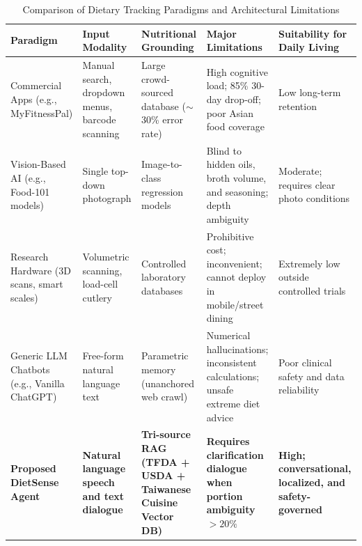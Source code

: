 \documentclass[conference]{IEEEtran}
\begin{document}
\begin{table}[t]
\caption{Comparison of Dietary Tracking Paradigms and Architectural Limitations}
\label{tab:comparison}
\centering
\begin{tabular}{@{}p{2.8cm}p{3.2cm}p{3.5cm}p{3.2cm}p{3.2cm}@{}}
\toprule
\textbf{Paradigm} & \textbf{Input Modality} & \textbf{Nutritional Grounding} & \textbf{Major Limitations} & \textbf{Suitability for Daily Living} \\
\midrule
Commercial Apps (e.g., MyFitnessPal) & Manual search, dropdown menus, barcode scanning & Large crowd-sourced database ($\sim$30\% error rate) & High cognitive load; 85\% 30-day drop-off; poor Asian food coverage & Low long-term retention \\
\addlinespace
Vision-Based AI (e.g., Food-101 models) & Single top-down photograph & Image-to-class regression models & Blind to hidden oils, broth volume, and seasoning; depth ambiguity & Moderate; requires clear photo conditions \\
\addlinespace
Research Hardware (3D scans, smart scales) & Volumetric scanning, load-cell cutlery & Controlled laboratory databases & Prohibitive cost; inconvenient; cannot deploy in mobile/street dining & Extremely low outside controlled trials \\
\addlinespace
Generic LLM Chatbots (e.g., Vanilla ChatGPT) & Free-form natural language text & Parametric memory (unanchored web crawl) & Numerical hallucinations; inconsistent calculations; unsafe extreme diet advice & Poor clinical safety and data reliability \\
\addlinespace
\textbf{Proposed DietSense Agent} & \textbf{Natural language speech and text dialogue} & \textbf{Tri-source RAG (TFDA + USDA + Taiwanese Cuisine Vector DB)} & \textbf{Requires clarification dialogue when portion ambiguity $>20\%$} & \textbf{High; conversational, localized, and safety-governed} \\
\bottomrule
\end{tabular}
\end{table}
\end{document}
